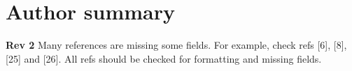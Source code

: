 \documentclass[10pt,letterpaper]{article}
\begin{document}
\section*{Author summary}
\AuthorSummary
\linenumbers










\nolinenumbers

%
%
%


{\color{red} \textbf{Rev 2} Many references are missing some fields. For example, check refs [6], [8], [25] and [26]. All refs should be checked for formatting and missing fields.}


\end{document}
